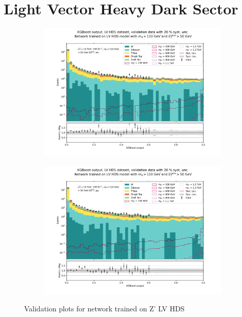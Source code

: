 \documentclass[12pt, a4paper]{book}
\begin{document}
\section{Light Vector Heavy Dark Sector}
\begin{figure}[!ht]
	\centering
	\begin{subfigure}[b]{0.49\textwidth}
      \centering
      \includegraphics[width=1\textwidth]{XGBoost/LV_HDS/VAL_ee.pdf}
      \end{subfigure}
   \hfill
   \begin{subfigure}[b]{0.49\textwidth}
      \centering
      \includegraphics[width=1\textwidth]{XGBoost/LV_HDS/VAL_uu.pdf}
      \end{subfigure}
   \caption{Validation plots for network trained on Z' LV HDS}\label{fig:LV_HDS_vals}
\end{figure}
\end{document}
